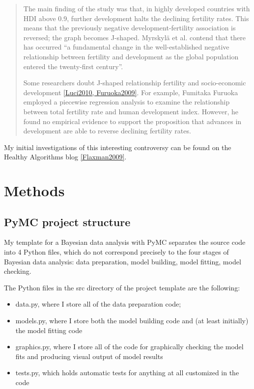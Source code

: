 \documentclass[10pt]{bmc_article}
\newenvironment{bmcformat}{\begin{raggedright}\baselineskip20pt\sloppy\setboolean{publ}{false}}{\end{raggedright}\baselineskip20pt\sloppy}
\begin{document}
\begin{bmcformat}
\begin{quote}
The main finding of the study was that, in highly developed countries
with HDI above 0.9, further development halts the declining fertility
rates. This means that the previously negative development-fertility
association is reversed; the graph becomes J-shaped. Myrskylä et
al. contend that there has occurred “a fundamental change in the
well-established negative relationship between fertility and
development as the global population entered the twenty-first
century”.

Some researchers doubt J-shaped relationship fertility and
socio-economic development \ref{Luci2010, Furuoka2009}. For example,
Fumitaka Furuoka employed a piecewise regression analysis to
examine the relationship between total fertility rate and human
development index. However, he found no empirical evidence to support
the proposition that advances in development are able to reverse
declining fertility rates.
\end{quote}

My initial investigations of this interesting controversy can be found
on the Healthy Algorithms blog \ref{Flaxman2009}.


\section*{Methods}
  \subsection*{PyMC project structure}
  My template for a Bayesian data analysis with PyMC separates the
  source code into 4 Python files, which do not correspond precisely
  to the four stages of Bayesian data analysis: data preparation,
  model building, model fitting, model checking.

  The Python files in the src directory of the project template are the following:
\begin{itemize}
\item data.py, where I store all of the data preparation code;
\item models.py, where I store both the model building code and (at
  least initially) the model fitting code
\item graphics.py, where I store all of the code for graphically checking the model fits and producing visual output of model results
\item tests.py, which holds automatic tests for anything at all customized in the code
\end{itemize}


\end{bmcformat}
\end{document}
